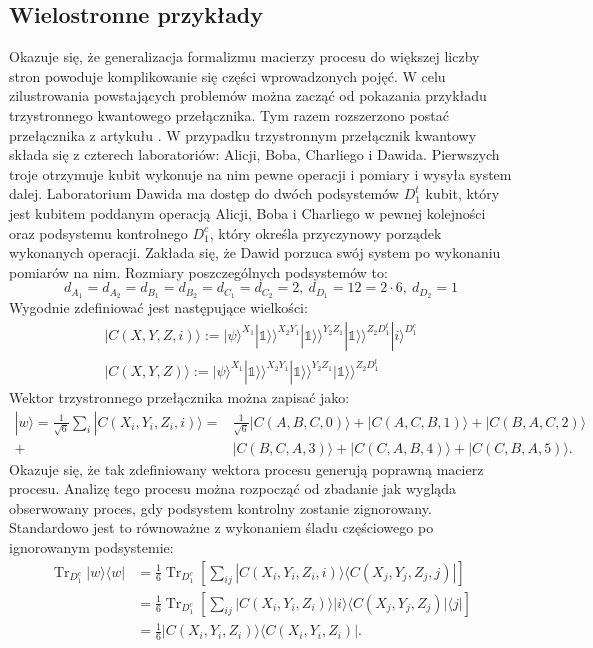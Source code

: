 \documentclass[10pt]{article} %
\DeclareMathOperator{\Trs}{Tr}
\newcommand{\Ket}[1]{|#1\rangle}
\newcommand{\Bra}[1]{\langle#1|}
\newcommand{\KKet}[1]{|#1\rangle\rangle}
\newcommand{\I}{\mathbb{1}}
\begin{document}
\subsection{Wielostronne przykłady}
Okazuje się, że generalizacja formalizmu macierzy procesu do większej liczby stron powoduje komplikowanie się części wprowadzonych pojęć. W celu zilustrowania powstających problemów można zacząć od pokazania przykładu trzystronnego kwantowego przełącznika. Tym razem rozszerzono postać przełącznika z artykułu \cite{causal_witness}. W przypadku trzystronnym przełącznik kwantowy składa się z czterech laboratoriów: Alicji, Boba, Charliego i Dawida. Pierwszych troje otrzymuje kubit wykonuje na nim pewne operacji i pomiary i wysyła system dalej. Laboratorium Dawida ma dostęp do dwóch podsystemów $D_1^t$ kubit, który jest kubitem poddanym operacją Alicji, Boba i Charliego w pewnej kolejności oraz podsystemu kontrolnego $D_1^c$, który określa przyczynowy porządek wykonanych operacji. Zakłada się, że Dawid porzuca swój system po wykonaniu pomiarów na nim. Rozmiary poszczególnych podsystemów to:
\begin{equation}
d_{A_1} = d_{A_2} = d_{B_1} = d_{B_2} = d_{C_1} = d_{C_2} = 2,~ d_{D_1} = 12 = 2 \cdot 6,~d_{D_2}=1
\end{equation}
Wygodnie zdefiniować jest następujące wielkości:
\begin{gather}
\Ket{C(X,Y,Z, i)} := \Ket{\psi}^{X_1}\KKet{\I}^{X_2Y_1}\KKet{\I}^{Y_2Z_1}\KKet{\I}^{Z_2D_1^t}\Ket{i}^{D_1^c} \\
\Ket{C(X,Y,Z)} := \Ket{\psi}^{X_1}\KKet{\I}^{X_2Y_1}\KKet{\I}^{Y_2Z_1}\KKet{\I}^{Z_2D_1^t}
\end{gather}
Wektor trzystronnego przełącznika można zapisać jako:
\begin{equation}
\begin{split}
\Ket{w} = \frac{1}{\sqrt{6}} \sum_i \Ket{C(X_i, Y_i, Z_i, i)} =& \frac{1}{\sqrt{6}} \Ket{C(A,B,C,0)} + \Ket{C(A,C,B,1)} + \Ket{C(B,A,C,2)} \\ +& \Ket{C(B,C,A,3)} + \Ket{C(C,A,B,4)} + \Ket{C(C,B,A,5)}.
\end{split}
\end{equation}
Okazuje się, że tak zdefiniowany wektora procesu generują poprawną macierz procesu. Analizę tego procesu można rozpocząć od zbadanie jak wygląda obserwowany proces, gdy podsystem kontrolny zostanie zignorowany. Standardowo jest to równoważne z wykonaniem śladu częściowego po ignorowanym podsystemie:
\begin{equation}
\begin{split}
\Trs_{D_1^c} \Ket{w}\Bra{w} &= \frac{1}{6}\Trs_{D_1^c} \left[ \sum_{ij} \Ket{C(X_i, Y_i, Z_i, i)}\Bra{C(X_j, Y_j, Z_j, j)}\right] \\
&=  \frac{1}{6}\Trs_{D_1^c} \left[ \sum_{ij} \Ket{C(X_i, Y_i, Z_i)}\Ket{i}\Bra{C(X_j, Y_j, Z_j)}\Bra{j}\right] \\ 
&= \frac{1}{6}\Ket{C(X_i, Y_i, Z_i)}\Bra{C(X_i, Y_i, Z_i)}.
\end{split}
\end{equation}
\end{document}
